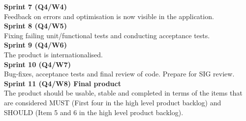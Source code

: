 \documentclass[10pt,a4paper]{report}
\begin{document}
			\textbf{Sprint 7 (Q4/W4)}\\
				Feedback on errors and optimisation is now visible in the application.\\
			\textbf{Sprint 8 (Q4/W5)}\\
				Fixing failing unit/functional tests and conducting acceptance tests.\\
			\textbf{Sprint 9 (Q4/W6)}\\
				The product is internationalised.\\
			\textbf{Sprint 10 (Q4/W7)}\\
				Bug-fixes, acceptance tests and final review of code. Prepare for SIG review.\\
			\textbf{Sprint 11 (Q4/W8) Final product}\\
				The product should be usable, stable and completed in terms of the items that are considered MUST (First four in the high level product backlog) and SHOULD (Item 5 and 6 in the high level product backlog).

	\clearpage
\end{document}
